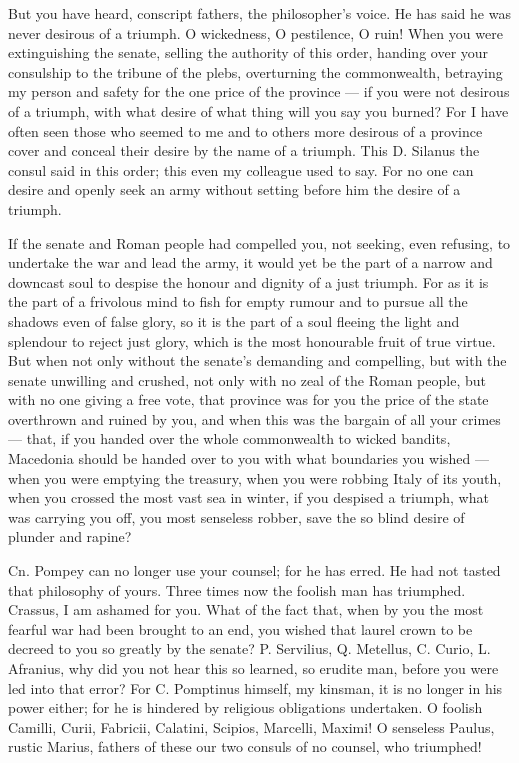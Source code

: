  But you have heard, conscript fathers, the philosopher's voice. He has said he was never desirous of a triumph. O wickedness, O pestilence, O ruin! When you were extinguishing the senate, selling the authority of this order, handing over your consulship to the tribune of the plebs, overturning the commonwealth, betraying my person and safety for the one price of the province — if you were not desirous of a triumph, with what desire of what thing will you say you burned? For I have often seen those who seemed to me and to others more desirous of a province cover and conceal their desire by the name of a triumph. This D. Silanus the consul said in this order; this even my colleague used to say. For no one can desire and openly seek an army without setting before him the desire of a triumph.

 If the senate and Roman people had compelled you, not seeking, even refusing, to undertake the war and lead the army, it would yet be the part of a narrow and downcast soul to despise the honour and dignity of a just triumph. For as it is the part of a frivolous mind to fish for empty rumour and to pursue all the shadows even of false glory, so it is the part of a soul fleeing the light and splendour to reject just glory, which is the most honourable fruit of true virtue. But when not only without the senate's demanding and compelling, but with the senate unwilling and crushed, not only with no zeal of the Roman people, but with no one giving a free vote, that province was for you the price of the state overthrown and ruined by you, and when this was the bargain of all your crimes — that, if you handed over the whole commonwealth to wicked bandits, Macedonia should be handed over to you with what boundaries you wished — when you were emptying the treasury, when you were robbing Italy of its youth, when you crossed the most vast sea in winter, if you despised a triumph, what was carrying you off, you most senseless robber, save the so blind desire of plunder and rapine?

 Cn. Pompey can no longer use your counsel; for he has erred. He had not tasted that philosophy of yours. Three times now the foolish man has triumphed. Crassus, I am ashamed for you. What of the fact that, when by you the most fearful war had been brought to an end, you wished that laurel crown to be decreed to you so greatly by the senate? P. Servilius, Q. Metellus, C. Curio, L. Afranius, why did you not hear this so learned, so erudite man, before you were led into that error? For C. Pomptinus himself, my kinsman, it is no longer in his power either; for he is hindered by religious obligations undertaken. O foolish Camilli, Curii, Fabricii, Calatini, Scipios, Marcelli, Maximi! O senseless Paulus, rustic Marius, fathers of these our two consuls of no counsel, who triumphed!

